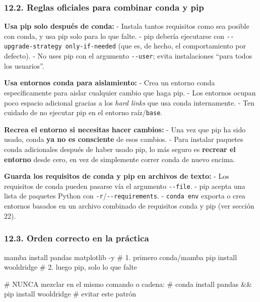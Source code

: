 \documentclass[
  doc,
  floatsintext,
  longtable,
  a4paper,
  nolmodern,
  notxfonts,
  notimes,
  12pt,
  colorlinks=true,linkcolor=blue,citecolor=blue,urlcolor=blue]{apa7}
\newenvironment{Shaded}{\begin{snugshade}}{\end{snugshade}}
\newcommand{\AttributeTok}[1]{\textcolor[rgb]{0.40,0.45,0.13}{#1}}
\newcommand{\CommentTok}[1]{\textcolor[rgb]{0.37,0.37,0.37}{#1}}
\newcommand{\ExtensionTok}[1]{\textcolor[rgb]{0.00,0.23,0.31}{#1}}
\newcommand{\NormalTok}[1]{\textcolor[rgb]{0.00,0.23,0.31}{#1}}
\begin{document}
\subsubsection{12.2. Reglas oficiales para combinar conda y
pip}\label{reglas-oficiales-para-combinar-conda-y-pip}

\textbf{Usa pip solo después de conda:} - Instala tantos requisitos como
sea posible con conda, y usa pip solo para lo que falte. - pip debería
ejecutarse con \texttt{-\/-upgrade-strategy\ only-if-needed} (que es, de
hecho, el comportamiento por defecto). - No uses pip con el argumento
\texttt{-\/-user}; evita instalaciones ``para todos los usuarios''.

\textbf{Usa entornos conda para aislamiento:} - Crea un entorno conda
específicamente para aislar cualquier cambio que haga pip. - Los
entornos ocupan poco espacio adicional gracias a los \emph{hard links}
que usa conda internamente. - Ten cuidado de no ejecutar pip en el
entorno raíz/\texttt{base}.

\textbf{Recrea el entorno si necesitas hacer cambios:} - Una vez que pip
ha sido usado, conda \textbf{ya no es consciente} de esos cambios. -
Para instalar paquetes conda adicionales después de haber usado pip, lo
más seguro es \textbf{recrear el entorno} desde cero, en vez de
simplemente correr conda de nuevo encima.

\textbf{Guarda los requisitos de conda y pip en archivos de texto:} -
Los requisitos de conda pueden pasarse vía el argumento
\texttt{-\/-file}. - pip acepta una lista de paquetes Python con
\texttt{-r}/\texttt{-\/-requirements}. - \texttt{conda\ env} exporta o
crea entornos basados en un archivo combinado de requisitos conda y pip
(ver sección 22).

\subsubsection{12.3. Orden correcto en la
práctica}\label{orden-correcto-en-la-pruxe1ctica}

\begin{Shaded}
\begin{Highlighting}[]
\ExtensionTok{mamba}\NormalTok{ install pandas matplotlib }\AttributeTok{{-}y}   \CommentTok{\# 1. primero conda/mamba}
\ExtensionTok{pip}\NormalTok{ install wooldridge               }\CommentTok{\# 2. luego pip, solo lo que falte}

\CommentTok{\# NUNCA mezclar en el mismo comando o cadena:}
\CommentTok{\# conda install pandas \&\& pip install wooldridge   \# evitar este patrón}
\end{Highlighting}
\end{Shaded}
\end{document}
